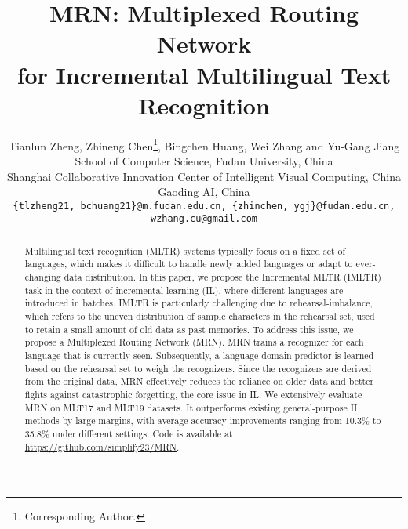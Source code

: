 \documentclass[10pt,twocolumn,letterpaper]{article}
\begin{document}
\title{MRN: Multiplexed Routing Network \\for Incremental Multilingual Text Recognition}

\author{
Tianlun Zheng,  Zhineng Chen\thanks{Corresponding Author.},  Bingchen Huang,  Wei Zhang and Yu-Gang Jiang\\
School of Computer Science, Fudan University, China\\
Shanghai Collaborative Innovation Center of Intelligent Visual Computing, China\\
Gaoding AI, China\\
{\tt\small\{tlzheng21, bchuang21\}@m.fudan.edu.cn,
\{zhinchen, ygj\}@fudan.edu.cn,
wzhang.cu@gmail.com}
}

\maketitle
\ificcvfinal\thispagestyle{empty}\fi


\maketitle

\begin{abstract}
Multilingual text recognition (MLTR) systems typically focus on a fixed set of languages, which makes it difficult to handle newly added languages or adapt to ever-changing data distribution. In this paper, we propose the Incremental MLTR (IMLTR) task in the context of incremental learning (IL), where different languages are introduced in batches. IMLTR is particularly challenging due to rehearsal-imbalance, which refers to the uneven distribution of sample characters in the rehearsal set, used to retain a small amount of old data as past memories. To address this issue, we propose a Multiplexed Routing Network (MRN). MRN trains a recognizer for each language that is currently seen. Subsequently, a language domain predictor is learned based on the rehearsal set to weigh the recognizers. Since the recognizers are derived from the original data, MRN effectively reduces the reliance on older data and better fights against catastrophic forgetting, the core issue in IL. We extensively evaluate MRN on MLT17 and MLT19 datasets. It outperforms existing general-purpose IL methods by large margins, with average accuracy improvements ranging from 10.3\% to 35.8\% under different settings. Code is available at \url{https://github.com/simplify23/MRN}.

\end{abstract}
\end{document}
